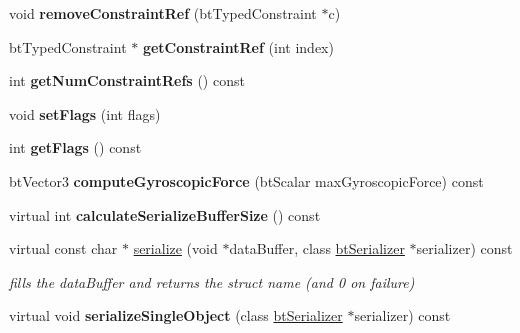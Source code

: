 \begin{DoxyCompactItemize}
\item 
\hypertarget{classbt_rigid_body_a86e4bf13e7acee4be2c77ed470f44dbe}{void {\bfseries remove\+Constraint\+Ref} (bt\+Typed\+Constraint $\ast$c)}\label{classbt_rigid_body_a86e4bf13e7acee4be2c77ed470f44dbe}

\item 
\hypertarget{classbt_rigid_body_abecb7d17ec15d9bec435f9fc7e5962fe}{bt\+Typed\+Constraint $\ast$ {\bfseries get\+Constraint\+Ref} (int index)}\label{classbt_rigid_body_abecb7d17ec15d9bec435f9fc7e5962fe}

\item 
\hypertarget{classbt_rigid_body_ae4580b475c234a05983409d8752c02a3}{int {\bfseries get\+Num\+Constraint\+Refs} () const }\label{classbt_rigid_body_ae4580b475c234a05983409d8752c02a3}

\item 
\hypertarget{classbt_rigid_body_a2756c378b93acd3eb16ee27c183efe9d}{void {\bfseries set\+Flags} (int flags)}\label{classbt_rigid_body_a2756c378b93acd3eb16ee27c183efe9d}

\item 
\hypertarget{classbt_rigid_body_aa904eb482f8cebb18aec4f47f61d6a4f}{int {\bfseries get\+Flags} () const }\label{classbt_rigid_body_aa904eb482f8cebb18aec4f47f61d6a4f}

\item 
\hypertarget{classbt_rigid_body_a1c4385ad3abb4988e47da39c3a37b54b}{bt\+Vector3 {\bfseries compute\+Gyroscopic\+Force} (bt\+Scalar max\+Gyroscopic\+Force) const }\label{classbt_rigid_body_a1c4385ad3abb4988e47da39c3a37b54b}

\item 
\hypertarget{classbt_rigid_body_a94c8fd5c64f12a942ff085d7542330ef}{virtual int {\bfseries calculate\+Serialize\+Buffer\+Size} () const }\label{classbt_rigid_body_a94c8fd5c64f12a942ff085d7542330ef}

\item 
\hypertarget{classbt_rigid_body_a9b1b5b688a59958aabcdf1fbc359182d}{virtual const char $\ast$ \hyperlink{classbt_rigid_body_a9b1b5b688a59958aabcdf1fbc359182d}{serialize} (void $\ast$data\+Buffer, class \hyperlink{classbt_serializer}{bt\+Serializer} $\ast$serializer) const }\label{classbt_rigid_body_a9b1b5b688a59958aabcdf1fbc359182d}

\begin{DoxyCompactList}\small\item\em fills the data\+Buffer and returns the struct name (and 0 on failure) \end{DoxyCompactList}\item 
\hypertarget{classbt_rigid_body_a626dc7ec38efc14fc4757dbe4d39e25a}{virtual void {\bfseries serialize\+Single\+Object} (class \hyperlink{classbt_serializer}{bt\+Serializer} $\ast$serializer) const }\label{classbt_rigid_body_a626dc7ec38efc14fc4757dbe4d39e25a}

\end{DoxyCompactItemize}

